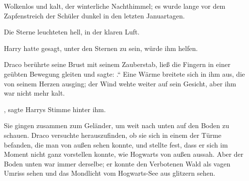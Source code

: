 Wolkenlos und kalt, der winterliche Nachthimmel; es wurde lange vor dem Zapfenstreich der Schüler dunkel in den letzten Januartagen.

Die Sterne leuchteten hell, in der klaren Luft.

Harry hatte gesagt, unter den Sternen zu sein, würde ihm helfen.

Draco berührte seine Brust mit seinem Zauberstab, ließ die Fingern in einer geübten Bewegung gleiten und sagte: .“ Eine Wärme breitete sich in ihm aus, die von seinem Herzen ausging; der Wind wehte weiter auf sein Gesicht, aber ihm war nicht mehr kalt.

, sagte Harrys Stimme hinter ihm.

Sie gingen zusammen zum Geländer, um weit nach unten auf den Boden zu schauen. Draco versuchte herauszufinden, ob sie sich in einem der Türme befanden, die man von außen sehen konnte, und stellte fest, dass er sich im Moment nicht ganz vorstellen konnte, wie Hogwarts von außen aussah. Aber der Boden unten war immer derselbe; er konnte den Verbotenen Wald als vagen Umriss sehen und das Mondlicht vom Hogwarts-See aus glitzern sehen.

